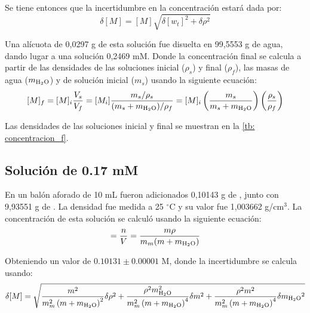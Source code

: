 		Se tiene entonces que la incertidumbre en la concentraci\'on estar\'a dada por:
		\begin{equation}
			\delta [M] = [M]\sqrt{\delta[w_t]^2 + \delta\rho^2} 
		\end{equation}
		
		Una al\'icuota de 0,0297 g de esta soluci\'on fue disuelta en 99,5553 g de agua, dando lugar a una soluci\'on 0,2469 mM. Donde la concentraci\'on final se calcula a partir de las densidades de las soluciones inicial ($\rho_s$) y final ($\rho_f$), las masas de agua ($m_\text{\ce{H2O}}$) y de soluci\'on inicial ($m_s$) usando la siguiente ecuaci\'on:
		\begin{equation}\label{eq: concentracion_f}
			[M]_f = [M]_i\dfrac{V_s}{V_f} = [M_i]\dfrac{m_s/\rho_s}{(m_s + m_{\text{\ce{H2O}}})/\rho_f} =  [M]_i\left(\dfrac{m_s}{m_s + m_{\text{\ce{H2O}}}}\right)\left(\dfrac{\rho_s}{\rho_f}\right)
		\end{equation}
		
		Las densidades de las soluciones inicial y final se muestran en la \autoref{tb: concentracion_f}.
		
	\subsection{Soluci\'on de  0.17 mM}
	En un bal\'on aforado de 10 mL fueron adicionados 0,10143 g de , junto con 9,93551 g de . La densidad fue medida a 25 $^\circ$C y su valor fue 1,003662 g/cm$^3$. La concentraci\'on de esta soluci\'on se calcul\'o usando la siguiente ecuaci\'on:
	\begin{equation}
		[M] = \dfrac{n}{V} = \dfrac{m\rho}{m_m(m + m_{\ce{H2O}})}
	\end{equation}

	Obteniendo un valor de $0.10131\pm 0.00001$ M, donde la incertidumbre se calcula usando:
	\small
	\begin{equation}
		\delta[M] = \sqrt{\frac{m^{2}}{m_m^{2} \left(m + m_{\text{\ce{H2O}}}\right)^{2}}\delta\rho^{2} + \frac{\rho^{2} m_{\text{\ce{H2O}}}^{2}}{m_m^{2} \left(m + m_{\text{\ce{H2O}}}\right)^{4}}\delta m^{2} + \frac{\rho^{2} m^{2}}{m_m^{2} \left(m + m_{\text{\ce{H2O}}}\right)^{4}}\delta{m_{\text{\ce{H2O}}}}^{2}}
	\end{equation}
	\normalsize
	
